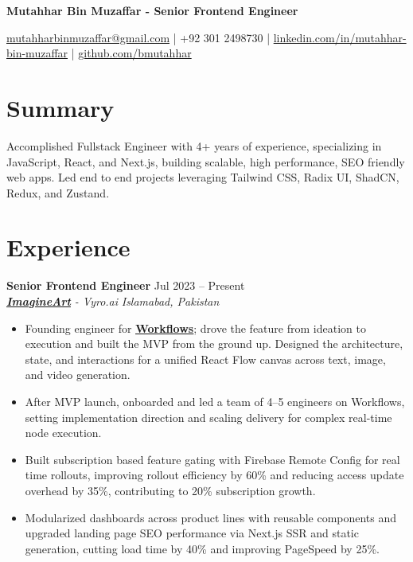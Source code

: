 \documentclass[10pt,letterpaper]{article}
\newcommand{\resumeHeader}[1]{%
  \begin{center}
    \vspace{2pt}
    {\fontsize{18pt}{20pt}\selectfont\bfseries #1\par}
    \vspace{4pt}
  \end{center}
}
\newcommand{\role}[4]{\textbf{#1} \hfill #2 \\
\textit{#3} \hfill \textit{#4}\\[-4pt]}
\begin{document}
\resumeHeader{Mutahhar Bin Muzaffar - Senior Frontend Engineer}
\begin{center}
\fontsize{9pt}{11pt}\selectfont
\href{mailto:mutahharbinmuzaffar@gmail.com}{mutahharbinmuzaffar@gmail.com} \;|\; +92 301 2498730 \;|\;
\href{https://www.linkedin.com/in/mutahhar-bin-muzaffar}{linkedin.com/in/mutahhar-bin-muzaffar} \;|\;
\href{https://github.com/bmutahhar}{github.com/bmutahhar}
\end{center}

\section*{Summary}
Accomplished Fullstack Engineer with 4+ years of experience, specializing in JavaScript, React, and Next.js, building scalable, high performance, SEO friendly web apps.
Led end to end projects leveraging Tailwind CSS, Radix UI, ShadCN, Redux, and Zustand.

\section*{Experience}
\role{Senior Frontend Engineer}{Jul 2023 -- Present}{\href{https://www.imagine.art/}{\textbf{\underline{ImagineArt}}} - Vyro.ai}{Islamabad, Pakistan}
\begin{itemize}[leftmargin=*, itemsep=1pt, topsep=0pt, partopsep=0pt, parsep=0pt, after=\vspace{4pt}]
  \item Founding engineer for \href{https://www.imagine.art/flow}{\textbf{\underline{Workflows}}}; drove the feature from ideation to execution and built the MVP from the ground up. Designed the architecture, state, and interactions for a unified React Flow canvas across text, image, and video generation.
  \item After MVP launch, onboarded and led a team of 4--5 engineers on Workflows, setting implementation direction and scaling delivery for complex real-time node execution.
  \item Built subscription based feature gating with Firebase Remote Config for real time rollouts, improving rollout efficiency by 60\% and reducing access update overhead by 35\%, contributing to 20\% subscription growth.
  \item Modularized dashboards across product lines with reusable components and upgraded landing page SEO performance via Next.js SSR and static generation, cutting load time by 40\% and improving PageSpeed by 25\%.

\end{itemize}
\end{document}

